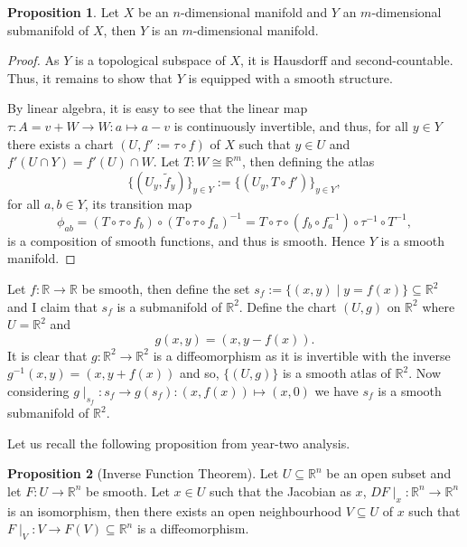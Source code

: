 \documentclass[]{article}
\theoremstyle{definition}
\theoremstyle{definition}
\newtheorem{proposition}{Proposition}[section]
\begin{document}
\begin{proposition}
  Let \(X\) be an \(n\)-dimensional manifold and \(Y\) an \(m\)-dimensional 
  submanifold of \(X\), then \(Y\) is an \(m\)-dimensional manifold.
\end{proposition}
\begin{proof}
  As \(Y\) is a topological subspace of \(X\), it is Hausdorff and 
  second-countable. Thus, it remains to show that \(Y\) is equipped with a 
  smooth structure. 

  By linear algebra, it is easy to see that the linear map 
  \(\tau : A = v + W \to W : a \mapsto a - v\) is continuously invertible, and thus, 
  for all \(y \in Y\) there exists a chart \((U, f' := \tau \circ f)\) of \(X\) 
  such that \(y \in U\) and \(f'(U \cap Y) = f'(U) \cap W\). 
  Let \(T : W \cong \mathbb{R}^m\), then defining the atlas 
  \[\{(U_y, \tilde f_y)\}_{y \in Y} := \{(U_y, T \circ f')\}_{y \in Y},\]
  for all \(a, b \in Y\), its transition map 
  \[\phi_{ab} = (T \circ \tau \circ f_b) \circ (T \circ \tau \circ f_a)^{-1}
    = T \circ \tau \circ (f_b \circ f_a^{-1}) \circ \tau^{-1} \circ T^{-1},\]
  is a composition of smooth functions, and thus is smooth. Hence \(Y\) is 
  a smooth manifold.
\end{proof}

Let \(f : \mathbb{R} \to \mathbb{R}\) be smooth, then 
define the set \(s_f := \{(x, y) \mid y = f(x)\} \subseteq \mathbb{R}^2\) and 
I claim that \(s_f\) is a submanifold of \(\mathbb{R}^2\). Define the chart 
\((U, g)\) on \(\mathbb{R}^2\) where \(U = \mathbb{R}^2\) and 
\[g(x, y) = (x, y - f(x)).\]
It is clear that \(g : \mathbb{R}^2 \to \mathbb{R}^2\) is a diffeomorphism as it 
is invertible with the inverse \(g^{-1}(x, y) = (x, y + f(x))\) and so, 
\(\{(U, g)\}\) is a smooth atlas of \(\mathbb{R}^2\). Now considering 
\(g\mid_{s_f} : s_f \to g(s_f) : (x, f(x)) \mapsto (x, 0)\) we have \(s_f\) is 
a smooth submanifold of \(\mathbb{R}^2\).

Let us recall the following proposition from year-two analysis.

\begin{proposition}[Inverse Function Theorem]
  Let \(U \subseteq \mathbb{R}^n\) be an open subset and let 
  \(F : U \to \mathbb{R}^n\) be smooth. Let \(x \in U\) such that the Jacobian 
  as \(x\), \(DF\mid_x : \mathbb{R}^n \to \mathbb{R}^n\) is an isomorphism, 
  then there exists an open neighbourhood \(V \subseteq U\) of \(x\) such that 
  \(F \mid_V : V \to F(V) \subseteq \mathbb{R}^n\) is a diffeomorphism.
\end{proposition}
\end{document}
